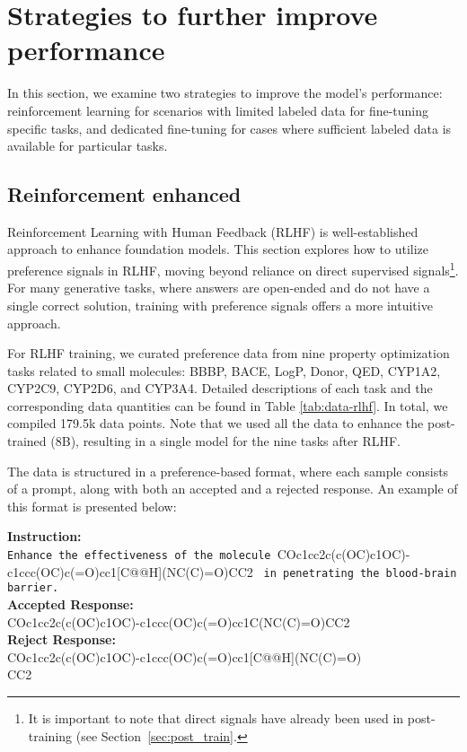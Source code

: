 \section{Strategies to further improve performance}
In this section, we examine two strategies to improve the model's performance: reinforcement learning for scenarios with limited labeled data for fine-tuning specific tasks, and dedicated fine-tuning for cases where sufficient labeled data is available for particular tasks.

\subsection{Reinforcement enhanced \ourM{}}
\label{sec:RL}
Reinforcement Learning with Human Feedback (RLHF) is well-established approach to enhance foundation models. This section explores how to utilize preference signals in RLHF, moving beyond reliance on direct supervised signals\footnote{It is important to note that direct signals have already been used in post-training (see Section~\ref{sec:post_train}.}. For many generative tasks, where answers are open-ended and do not have a single correct solution, training with preference signals offers a more intuitive approach.

For RLHF training, we curated preference data from nine property optimization tasks related to small molecules: BBBP, BACE, LogP, Donor, QED, CYP1A2, CYP2C9, CYP2D6, and CYP3A4. Detailed descriptions of each task and the corresponding data quantities can be found in Table \ref{tab:data-rlhf}. In total, we compiled 179.5k data points. Note that we used all the data to enhance the post-trained \ourM{} (8B), resulting in a single model for the nine tasks after RLHF.

The data is structured in a preference-based format, where each sample consists of a prompt, along with both an accepted and a rejected response. An example of this format is presented below:

\begin{example}
\textbf{Instruction: }\\\texttt{Enhance the effectiveness of the molecule }\mol{}COc1cc2c(c(OC)c1OC)-c1ccc(OC)c(=O)cc1[C@@H](NC(C)=O)CC2 \emol{}\texttt{ in penetrating the blood-brain barrier.}\\
\textbf{Accepted Response: }\\\mol{}COc1cc2c(c(OC)c1OC)-c1ccc(OC)c(=O)cc1C(NC(C)=O)CC2\emol{}\\
\textbf{Reject Response: }\\\mol{}COc1cc2c(c(OC)c1OC)-c1ccc(OC)c(=O)cc1[C@@H](NC(C)=O)\\CC2\emol{}
\end{example}  

